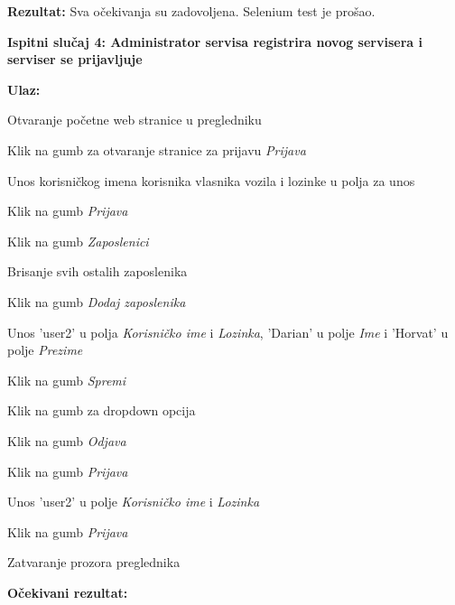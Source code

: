 			\noindent\textbf{Rezultat:} Sva očekivanja su zadovoljena. Selenium test je prošao.
			
			\hfill\break
			\noindent\textbf{Ispitni slučaj 4: Administrator servisa registrira novog servisera i serviser se prijavljuje}
			
			\hfill\break
			\noindent\textbf{Ulaz:}
			
			\begin{packed_enum}
				
				\item Otvaranje početne web stranice u pregledniku
				\item Klik na gumb za otvaranje stranice za prijavu \textit{Prijava}
				\item Unos korisničkog imena korisnika vlasnika vozila i lozinke u polja za unos
				\item Klik na gumb \textit{Prijava}
				\item Klik na gumb \textit{Zaposlenici}
				\item Brisanje svih ostalih zaposlenika
				\item Klik na gumb \textit{Dodaj zaposlenika}
				\item Unos 'user2' u polja \textit{Korisničko ime} i \textit{Lozinka}, 'Darian' u polje \textit{Ime} i 'Horvat' u polje \textit{Prezime}
				\item Klik na gumb \textit{Spremi}
				\item Klik na gumb za dropdown opcija
				\item Klik na gumb \textit{Odjava}
				\item Klik na gumb \textit{Prijava}
				\item Unos 'user2' u polje \textit{Korisničko ime} i \textit{Lozinka}
				\item Klik na gumb \textit{Prijava}
				\item Zatvaranje prozora preglednika
			
				
			\end{packed_enum}
			
			\noindent\textbf{Očekivani rezultat:}
			
